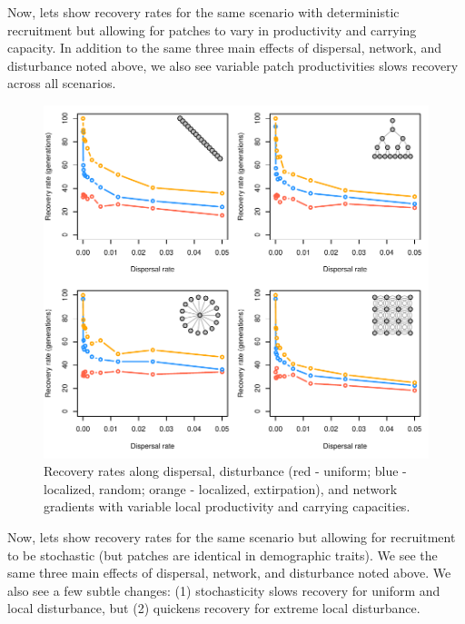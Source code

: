 \documentclass[
]{article}
\begin{document}
Now, lets show recovery rates for the same scenario with deterministic
recruitment but allowing for patches to vary in productivity and
carrying capacity. In addition to the same three main effects of
dispersal, network, and disturbance noted above, we also see variable
patch productivities slows recovery across all scenarios.

\begin{figure}[H]

{\centering \includegraphics{Managing_for_ecological_surprises_in_metapopulations_files/figure-latex/results for variables patches-1} 

}

\caption{Recovery rates along dispersal, disturbance (red - uniform; blue - localized, random; orange - localized, extirpation), and network gradients with variable local productivity and carrying capacities.}\label{fig:results for variables patches}
\end{figure}
\newpage

Now, lets show recovery rates for the same scenario but allowing for
recruitment to be stochastic (but patches are identical in demographic
traits). We see the same three main effects of dispersal, network, and
disturbance noted above. We also see a few subtle changes: (1)
stochasticity slows recovery for uniform and local disturbance, but (2)
quickens recovery for extreme local disturbance.
\end{document}
